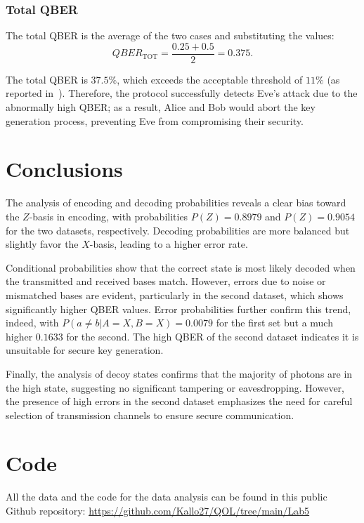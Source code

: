 \documentclass[prl,twocolumn]{revtex4-1}
\begin{document}
\subsubsection{Total QBER}

The total QBER is the average of the two cases and substituting the values:
\[
QBER_{\text{TOT}} = \frac{0.25 + 0.5}{2} = 0.375.
\]

The total QBER is $37.5\%$, which exceeds the acceptable threshold of $11\%$ (as reported in~\cite{pap3}). Therefore, the protocol successfully detects Eve's attack due to the abnormally high QBER; as a result, Alice and Bob would abort the key generation process, preventing Eve from compromising their security.


\section{Conclusions}
The analysis of encoding and decoding probabilities reveals a clear bias toward the $Z$-basis in encoding, with probabilities $P(Z) = 0.8979$ and $P(Z) = 0.9054$ for the two datasets, respectively. Decoding probabilities are more balanced but slightly favor the $X$-basis, leading to a higher error rate. 

Conditional probabilities show that the correct state is most likely decoded when the transmitted and received bases match. However, errors due to noise or mismatched bases are evident, particularly in the second dataset, which shows significantly higher QBER values. Error probabilities further confirm this trend, indeed, with $P(a \neq b|A=X, B=X) = 0.0079$ for the first set but a much higher $0.1633$ for the second. The high QBER of the second dataset indicates it is unsuitable for secure key generation.

Finally, the analysis of decoy states confirms that the majority of photons are in the high state, suggesting no significant tampering or eavesdropping. However, the presence of high errors in the second dataset emphasizes the need for careful selection of transmission channels to ensure secure communication.

\section{Code}
All the data and the code for the data analysis can be found in this public Github repository: \href{https://github.com/Kallo27/QOL/tree/main/Lab5}{https://github.com/Kallo27/QOL/tree/main/Lab5}
\end{document}
